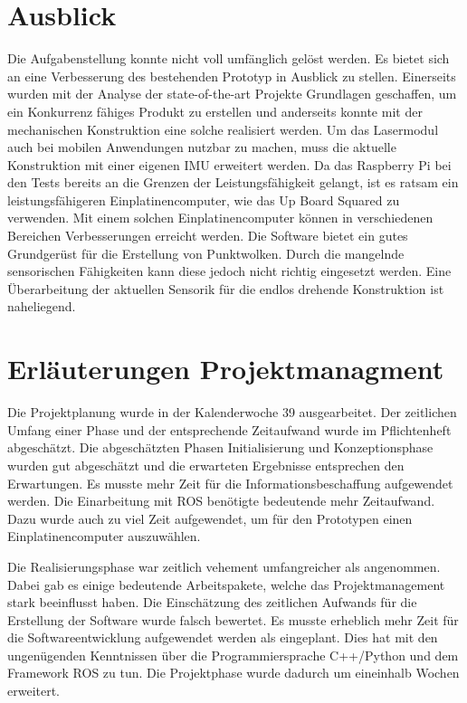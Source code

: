 \section{Ausblick}
\label{sec: Ausblick}
Die Aufgabenstellung konnte nicht voll umfänglich gelöst werden. Es bietet sich an eine Verbesserung des bestehenden Prototyp in Ausblick zu stellen. Einerseits wurden mit der Analyse der state-of-the-art Projekte Grundlagen geschaffen, um ein Konkurrenz fähiges Produkt zu erstellen und anderseits konnte mit der mechanischen Konstruktion eine solche realisiert werden. Um das Lasermodul auch bei mobilen Anwendungen nutzbar zu machen, muss die aktuelle Konstruktion mit einer eigenen IMU erweitert werden. Da das Raspberry Pi bei den Tests bereits an die Grenzen der Leistungsfähigkeit gelangt, ist es ratsam ein leistungsfähigeren Einplatinencomputer, wie das Up Board Squared zu verwenden. Mit einem solchen Einplatinencomputer können in verschiedenen Bereichen Verbesserungen erreicht werden. Die Software bietet ein gutes Grundgerüst für die Erstellung von Punktwolken. Durch die mangelnde sensorischen Fähigkeiten kann diese jedoch nicht richtig eingesetzt werden. Eine Überarbeitung der aktuellen Sensorik für die endlos drehende Konstruktion ist naheliegend. 

\section{Erläuterungen Projektmanagment}
\label{sec: pm}

Die Projektplanung wurde in der Kalenderwoche 39 ausgearbeitet. Der zeitlichen Umfang einer Phase und der entsprechende Zeitaufwand wurde im Pflichtenheft abgeschätzt. Die abgeschätzten Phasen Initialisierung und Konzeptionsphase wurden gut abgeschätzt und die erwarteten Ergebnisse entsprechen den Erwartungen. Es musste mehr Zeit für die Informationsbeschaffung aufgewendet werden. Die Einarbeitung mit ROS benötigte bedeutende mehr Zeitaufwand. Dazu wurde auch zu viel Zeit aufgewendet, um für den Prototypen einen Einplatinencomputer auszuwählen. 

Die Realisierungsphase war zeitlich vehement umfangreicher als angenommen. Dabei gab es einige bedeutende Arbeitspakete, welche das Projektmanagement stark beeinflusst haben. Die Einschätzung des zeitlichen Aufwands für die Erstellung der Software wurde falsch bewertet. Es musste erheblich mehr Zeit für die Softwareentwicklung aufgewendet werden als eingeplant. Dies hat mit den ungenügenden Kenntnissen über die Programmiersprache C++/Python und dem Framework ROS zu tun. Die Projektphase wurde dadurch um eineinhalb Wochen erweitert. 

